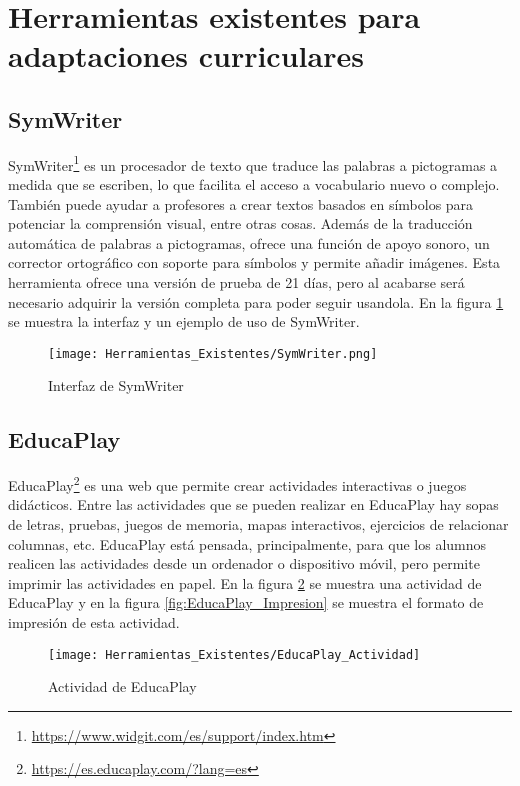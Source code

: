\section{Herramientas existentes para adaptaciones curriculares}\label{cap:herramientas}
\subsection{SymWriter}
SymWriter\footnote{\url{https://www.widgit.com/es/support/index.htm}} es un procesador de texto que traduce las palabras a pictogramas a medida que se escriben, lo que facilita el acceso a vocabulario nuevo o complejo. También puede ayudar a profesores a crear textos basados en símbolos para potenciar la comprensión visual, entre otras cosas. Además de la traducción automática de palabras a pictogramas, ofrece una función de apoyo sonoro, un corrector ortográfico con soporte para símbolos y permite añadir imágenes. Esta herramienta ofrece una versión de prueba de 21 días, pero al acabarse será necesario adquirir la versión completa para poder seguir usandola. En la figura \ref{fig:SymWriter} se muestra la interfaz y un ejemplo de uso de SymWriter.

\begin{figure}
    \centering
    \texttt{[image: Herramientas\_Existentes/SymWriter.png]}
    \caption{Interfaz de SymWriter}
    \label{fig:SymWriter}
\end{figure}

\subsection{EducaPlay}
EducaPlay\footnote{\url{https://es.educaplay.com/?lang=es}} es una web que permite crear actividades interactivas o juegos didácticos. Entre las actividades que se pueden realizar en EducaPlay hay sopas de letras, pruebas, juegos de memoria, mapas interactivos, ejercicios de relacionar columnas, etc. EducaPlay está pensada, principalmente, para que los alumnos realicen las actividades desde un ordenador o dispositivo móvil, pero permite imprimir las actividades en papel. En la figura \ref{fig:EducaPlay_Actividad} se muestra una actividad de EducaPlay y en la figura \ref{fig:EducaPlay_Impresion} se muestra el formato de impresión de esta actividad.

\begin{figure}
    \centering
    \texttt{[image: Herramientas\_Existentes/EducaPlay\_Actividad]}
    \caption{Actividad de EducaPlay}
    \label{fig:EducaPlay_Actividad}
\end{figure}

